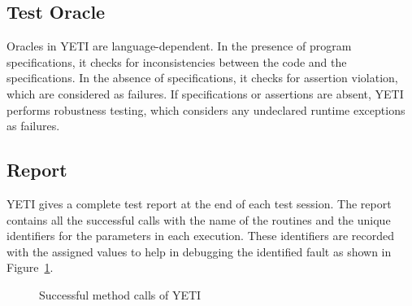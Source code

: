 \subsection{Test Oracle}
Oracles in YETI are language-dependent. In the presence of program specifications, it checks for inconsistencies between the code and the specifications. In the absence of specifications, it checks for assertion violation, which are considered as failures. %
If specifications or assertions are absent, YETI performs robustness testing, which considers any undeclared runtime exceptions as failures. 


\subsection{Report}
YETI gives a complete test report at the end of each test session. The report contains all the successful calls with the name of the routines and the unique identifiers for the parameters in each execution. These identifiers are recorded with the assigned values to help in debugging the identified fault as shown in Figure~\ref{successReport}. 
\bigskip
\begin{figure}[H]
	\centering
	\smallskip
	\caption{Successful method calls of YETI}
	\label{successReport}
\end{figure}

